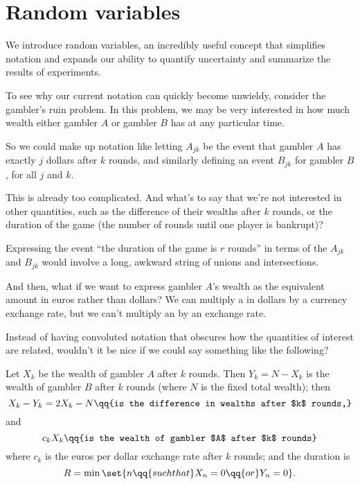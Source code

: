 \documentclass{ccg-topic}
\author{Blitzstein and Hwang (edited by Colton)}
\date{\today}
\begin{document}
\frontstuff

\section{Random variables}

We introduce random variables, an incredibly useful concept that
simplifies notation and expands our ability to quantify uncertainty and summarize the results of experiments.

To see why our current notation can quickly become unwieldy, consider the gambler’s ruin problem. In this problem, we may be very interested in how much wealth either gambler $A$ or gambler $B$ has at any particular time. 

So we could make up notation like letting $A_{jk}$ be the event that gambler $A$ has exactly $j$ dollars after $k$ rounds, and similarly defining an event $B_{jk}$ for gambler $B$, for all $j$ and $k$.

This is already too complicated. And what's to say that we're not interested in other quantities, such as the difference of their wealths after $k$ rounds, or the duration of the game (the number of rounds until one player is bankrupt)?

Expressing the event ``the duration of the game is $r$ rounds'' in terms of
the $A_{jk}$ and $B_{jk}$ would involve a long, awkward string of unions and intersections.

And then, what if we want to express gambler $A$’s wealth as the equivalent amount in euros rather than dollars? We can multiply a  in dollars by a currency exchange rate, but we can’t multiply an  by an exchange rate.

Instead of having convoluted notation that obscures how the quantities of interest are related, wouldn't it be nice if we could say something like the following? 

Let $X_k$ be the wealth of gambler $A$ after $k$ rounds. Then $Y_k = N - X_k$ is the wealth of gambler $B$ after $k$ rounds (where $N$ is the fixed total wealth); then
\begin{equation*}
    \label{difference}
    X_k - Y_k = 2X_k - N \qq{is the difference in wealths after $k$ rounds,}
\end{equation*}
and
\begin{equation*}
    \label{euros}
    c_kX_k \qq{is the wealth of gambler $A$ after $k$ rounds}
\end{equation*}
where $c_k$ is the euros per dollar exchange rate after $k$ rounds; and the duration is \[R = \min\set{n \qq{such that} X_n = 0 \qq{or}Y_n = 0}.\]
\end{document}
